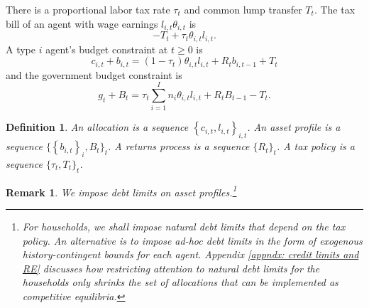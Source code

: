 \documentclass[thmsb,11pt]{article}
\newtheorem{definition}{Definition}
\newtheorem{remark}{Remark}
\begin{document}
There is a proportional labor tax rate $\tau_t$ and common lump transfer $T_t$.
The tax bill of an agent with wage earnings $l_{i,t}\theta_{i,t}$
is
\[
-T_{t}+\tau_{t}\theta_{i,t}l_{i,t}.
\]
A type $i$ agent's  budget constraint at $t \geq 0$ is%
\begin{equation}
c_{i,t}+b_{i,t}=\left( 1-\tau _{t}\right) \theta
_{i,t}l_{i,t}+R_{t}b_{i,t-1}+T_{t} \label{agent bc affine}
\end{equation}
%
and the government budget constraint is%
\begin{equation}
g_{t}+B_{t}=\tau _{t}\sum_{i=1}^{I}n_{i}\theta
_{i,t}l_{i,t}+R_{t}B_{t-1} -T_{t}.  \label{govmt bc affine}
\end{equation}%


\begin{definition}
\label{Def:components} An \emph{allocation} is a sequence $\left \{
c_{i,t},l_{i,t}\right \} _{i,t}$. An \emph{asset profile} is a sequence $\{
\left \{ b_{i,t}\right \} _{i},B_{t}\}_{t}$. A \emph{returns process} is a sequence $\{R_{t}\}_{t}$. A \emph{tax policy} is a sequence $%
\{ \tau _{t},T_{t}\}_{t}$.
\end{definition}
%

\begin{remark}
\label{rem:debtlimits}
We impose debt limits on asset profiles.\footnote{For households, we shall impose natural debt limits that  depend
on the  tax policy. An alternative is to impose ad-hoc debt limits in the form of  exogenous history-contingent bounds
for each agent. Appendix \ref{appndx: credit limits and RE} discusses how restricting attention to natural debt limits for the households only shrinks the set of allocations that can
be implemented as competitive equilibria.}
 \end{remark}
\end{document}
